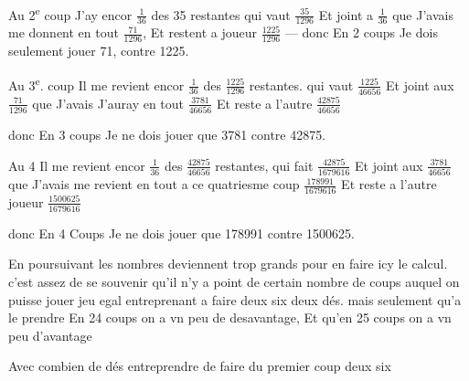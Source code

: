\documentclass[11pt,a4paper]{article}
\begin{document}
Au 2\textsuperscript{e} coup J'ay encor $\frac{1}{36}$ des 35 restantes qui vaut $\frac{35}{1296}$ Et joint a $\frac{1}{36}$ que J'avais me donnent en tout $\frac{71}{1296}$, Et restent a  joueur $\frac{1225}{1296}$ — donc En 2 coups Je dois seulement jouer 71, contre 1225.

Au 3\textsuperscript{e}. coup Il me revient encor $\frac{1}{36}$ des $\frac{1225}{1296}$ restantes. qui vaut \struck{\ill{}} $\frac{1225}{46656}$ Et   joint aux $\frac{71}{1296}$ que J'avais J'auray en tout $\frac{3781}{46656}$ Et reste a l'autre $\frac{42875}{46656}$

donc En 3 coups Je ne dois jouer que 3781 contre 42875.

Au 4 Il me revient encor $\frac{1}{36}$ des $\frac{42875}{46656}$ restantes, qui fait $\frac{42875}{1679616}$ Et joint aux $\frac{3781}{46656}$ que J'avais me revient en tout a ce quatriesme coup $\frac{178991}{1679616}$ Et reste a l'autre joueur $\frac{1500625}{1679616}$

donc En 4 Coups Je ne dois jouer que 178991 contre 1500625.

En poursuivant les nombres deviennent trop grands pour en faire icy le calcul. c'est assez de se souvenir qu'il n'y a point de certain nombre de coups auquel on puisse jouer jeu egal entreprenant a faire deux six  deux dés. mais seulement qu'a le prendre En 24 coups on a vn peu de desavantage, Et qu'en 25 coups on a vn peu  d'avantage

Avec combien de dés entreprendre de faire du premier coup deux six


\end{document}
